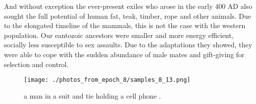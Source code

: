 \documentclass{article}%
\begin{document}
And without exception the ever{-}present exiles who arose in the early 400 AD also sought the full potential of human fat, teak, timber, rope and other animals. Due to the elongated timeline of the mammals, this is not the case with the western population.\newline%
Our eantozoic ancestors were smaller and more energy efficient, socially less susceptible to sex assaults. Due to the adaptations they showed, they were able to cope with the sudden abundance of male mates and gift{-}giving for selection and control.\newline%

%


\begin{figure}[h!]%
\centering%
\texttt{[image: ./photos\_from\_epoch\_8/samples\_8\_13.png]}%
\caption{a man in a suit and tie holding a cell phone .}%
\end{figure}

%
\end{document}
